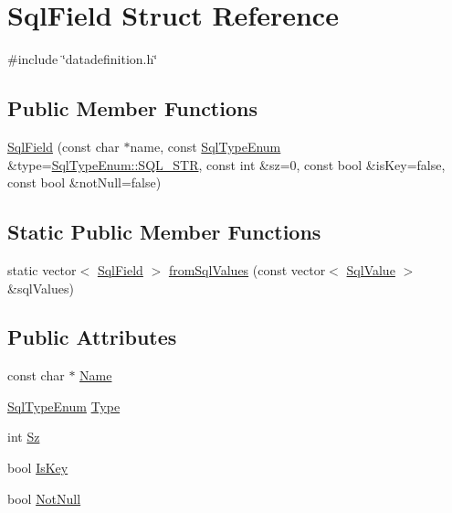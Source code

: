 \hypertarget{structSqlField}{}\section{Sql\+Field Struct Reference}
\label{structSqlField}


{\ttfamily \#include \char`\"{}datadefinition.\+h\char`\"{}}

\subsection*{Public Member Functions}
\begin{DoxyCompactItemize}
\item 
\mbox{\hyperlink{structSqlField_af348c54a252bf9ae67e7f280737aa5d0}{Sql\+Field}} (const char $\ast$name, const \mbox{\hyperlink{datadefinition_8h_ad06ef517a8bb3398f146f81f18988b9f}{Sql\+Type\+Enum}} \&type=\mbox{\hyperlink{datadefinition_8h_ad06ef517a8bb3398f146f81f18988b9faa5ec7b1f6f558b362f5a9ced5f228c2b}{Sql\+Type\+Enum\+::\+S\+Q\+L\+\_\+\+S\+TR}}, const int \&sz=0, const bool \&is\+Key=false, const bool \&not\+Null=false)
\end{DoxyCompactItemize}
\subsection*{Static Public Member Functions}
\begin{DoxyCompactItemize}
\item 
static vector$<$ \mbox{\hyperlink{structSqlField}{Sql\+Field}} $>$ \mbox{\hyperlink{structSqlField_a4349ebac0f3a6ddbbd81fdb3fbc268f0}{from\+Sql\+Values}} (const vector$<$ \mbox{\hyperlink{structSqlValue}{Sql\+Value}} $>$ \&sql\+Values)
\end{DoxyCompactItemize}
\subsection*{Public Attributes}
\begin{DoxyCompactItemize}
\item 
const char $\ast$ \mbox{\hyperlink{structSqlField_ace03689493f338658646e0ac61d3a885}{Name}}
\item 
\mbox{\hyperlink{datadefinition_8h_ad06ef517a8bb3398f146f81f18988b9f}{Sql\+Type\+Enum}} \mbox{\hyperlink{structSqlField_afb3221f041d06f2c792e0eef1195d0cf}{Type}}
\item 
int \mbox{\hyperlink{structSqlField_aef1c65782455a79a4797ed16bf7f296b}{Sz}}
\item 
bool \mbox{\hyperlink{structSqlField_a21d13bd62ab5c18b750f050c449a0c2e}{Is\+Key}}
\item 
bool \mbox{\hyperlink{structSqlField_aed207960cbeff50c17adc5a11f94b4a9}{Not\+Null}}
\end{DoxyCompactItemize}


